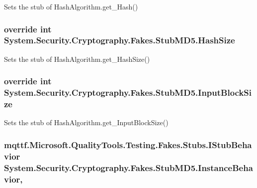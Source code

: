 Sets the stub of Hash\-Algorithm.\-get\-\_\-\-Hash()

\hypertarget{class_system_1_1_security_1_1_cryptography_1_1_fakes_1_1_stub_m_d5_aede4b39ca27e0ecc4d2711ae7fc716bb}{
\subsubsection[{Hash\-Size}]{\setlength{\rightskip}{0pt plus 5cm}override int System.\-Security.\-Cryptography.\-Fakes.\-Stub\-M\-D5.\-Hash\-Size\hspace{0.3cm}{\ttfamily [get]}}}\label{class_system_1_1_security_1_1_cryptography_1_1_fakes_1_1_stub_m_d5_aede4b39ca27e0ecc4d2711ae7fc716bb}


Sets the stub of Hash\-Algorithm.\-get\-\_\-\-Hash\-Size()

\hypertarget{class_system_1_1_security_1_1_cryptography_1_1_fakes_1_1_stub_m_d5_ab2a7237af419f8a5b390575cec1c6bcd}{
\subsubsection[{Input\-Block\-Size}]{\setlength{\rightskip}{0pt plus 5cm}override int System.\-Security.\-Cryptography.\-Fakes.\-Stub\-M\-D5.\-Input\-Block\-Size\hspace{0.3cm}{\ttfamily [get]}}}\label{class_system_1_1_security_1_1_cryptography_1_1_fakes_1_1_stub_m_d5_ab2a7237af419f8a5b390575cec1c6bcd}


Sets the stub of Hash\-Algorithm.\-get\-\_\-\-Input\-Block\-Size()

\hypertarget{class_system_1_1_security_1_1_cryptography_1_1_fakes_1_1_stub_m_d5_a86ac8b6392a56ed55d9ec05ebeb0ea5a}{
\subsubsection[{Instance\-Behavior}]{\setlength{\rightskip}{0pt plus 5cm}mqttf.\-Microsoft.\-Quality\-Tools.\-Testing.\-Fakes.\-Stubs.\-I\-Stub\-Behavior System.\-Security.\-Cryptography.\-Fakes.\-Stub\-M\-D5.\-Instance\-Behavior\hspace{0.3cm}{\ttfamily [get]}, {\ttfamily [set]}}}\label{class_system_1_1_security_1_1_cryptography_1_1_fakes_1_1_stub_m_d5_a86ac8b6392a56ed55d9ec05ebeb0ea5a}


